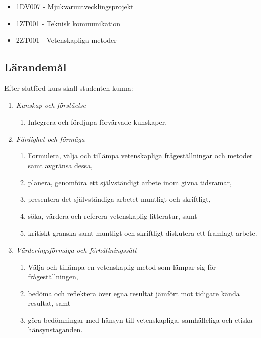\begin{itemize}
\tightlist
\item
  1DV007 - Mjukvaruutvecklingsprojekt
\item
  1ZT001 - Teknisk kommunikation
\item
  2ZT001 - Vetenskapliga metoder
\end{itemize}

\subsection*{Lärandemål}

Efter slutförd kurs skall studenten kunna:

\begin{enumerate}
\def\labelenumi{\Alph{enumi}.}
\tightlist
\item
  \emph{Kunskap och förståelse}

  \begin{enumerate}
  \def\labelenumii{\Alph{enumi}.\arabic{enumii}.}
  \tightlist
  \item
    Integrera och fördjupa förvärvade kunskaper.
  \end{enumerate}
\item
  \emph{Färdighet och förmåga}

  \begin{enumerate}
  \def\labelenumii{\Alph{enumi}.\arabic{enumii}.}
  \tightlist
  \item
    Formulera, välja och tillämpa vetenskapliga frågeställningar och
    metoder samt avgränsa dessa,
  \item
    planera, genomföra ett självständigt arbete inom givna tidsramar,
  \item
    presentera det självständiga arbetet muntligt och skriftligt,
  \item
    söka, värdera och referera vetenskaplig litteratur, samt
  \item
    kritiskt granska samt muntligt och skriftligt diskutera ett framlagt
    arbete.
  \end{enumerate}
\item
  \emph{Värderingsförmåga och förhållningssätt}

  \begin{enumerate}
  \def\labelenumii{\Alph{enumi}.\arabic{enumii}.}
  \tightlist
  \item
    Välja och tillämpa en vetenskaplig metod som lämpar sig för
    frågeställningen,
  \item
    bedöma och reflektera över egna resultat jämfört mot tidigare kända
    resultat, samt
  \item
    göra bedömningar med hänsyn till vetenskapliga, samhälleliga och
    etiska hänsynstaganden.
  \end{enumerate}
\end{enumerate}

